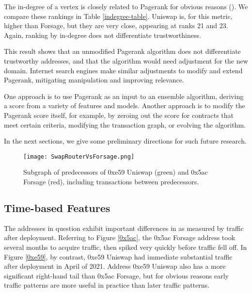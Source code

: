 \documentclass[a4paper]{article}
\begin{document}
The in-degree of a vertex is closely related to Pagerank for obvious reasons (\cite{Indegree1, Indegree2}).  We compare these rankings in Table \ref{indegree-table}.  Uniswap is, for this metric, higher than Forsage, but they are very close, appearing at ranks 21 and 23.  Again, ranking by in-degree does not differentiate trustworthiness.

This result shows that an unmodified Pagerank algorithm does not differentiate trustworthy addresses, and that the algorithm would need adjustment for the new domain.  Internet search engines make similar adjustments to modify and extend Pagerank, mitigating manipulation and improving relevance.

One approach is to use Pagerank as an input to an ensemble algorithm, deriving a score from a variety of features and models.  Another approach is to modify the Pagerank score itself, for example, by zeroing out the score for contracts that meet certain criteria, modifying the transaction graph, or evolving the algorithm.

  In the next sections, we give some preliminary directions for such future research.




\begin{figure}[h]
\begin{center}
\texttt{[image: SwapRouterVsForsage.png]}
\caption{Subgraph of predecessors of 0xe59 Uniswap (green) and 0x5ac Forsage (red), including transactions between predecessors.}
\label{subgraph}
\end{center}
\end{figure}

\subsection{Time-based Features}

The addresses in question exhibit important differences in as measured by traffic after deployment.  Referring to Figure \ref{0x5ac}, the 0x5ac Forsage address took several months to acquire traffic, then spiked very quickly before traffic fell off.  In Figure \ref{0xe59}, by contrast, 0xe59 Uniswap had immediate substantial traffic after deployment in April of 2021.  Address 0xe59 Uniswap also has a more significant right-hand tail than 0x5ac Forsage,  but for obvious reasons early traffic patterns are more useful in practice than later traffic patterns.
\end{document}
